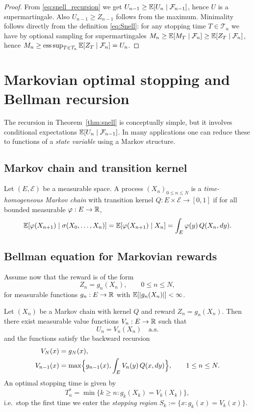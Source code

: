 \begin{proof}
From \eqref{eq:snell_recursion} we get $U_{n-1}\ge \mathbb{E}[U_n\mid\mathcal{F}_{n-1}]$, hence $U$ is a supermartingale.
Also $U_{n-1}\ge Z_{n-1}$ follows from the maximum. Minimality follows directly from the definition
\eqref{eq:Snell}: for any stopping time $T\in\mathcal{T}_n$ we have by optional sampling for supermartingales
$M_n\ge \mathbb{E}[M_T\mid\mathcal{F}_n]\ge \mathbb{E}[Z_T\mid\mathcal{F}_n]$, hence $M_n\ge \operatorname*{ess\,sup}_{T\in\mathcal{T}_n}\mathbb{E}[Z_T\mid\mathcal{F}_n]=U_n$.
\end{proof}

\section{Markovian optimal stopping and Bellman recursion}

The recursion in Theorem~\ref{thm:snell} is conceptually simple, but it involves conditional expectations
$\mathbb{E}[U_n\mid\mathcal{F}_{n-1}]$. In many applications one can reduce these to functions of a \emph{state variable}
using a Markov structure.

\subsection{Markov chain and transition kernel}

Let $(E,\mathcal{E})$ be a measurable space. A process $(X_n)_{0\le n\le N}$ is a \emph{time-homogeneous Markov chain}
with transition kernel $Q:E\times\mathcal{E}\to[0,1]$ if for all bounded measurable $\varphi:E\to\mathbb{R}$,
\[
\mathbb{E}[\varphi(X_{n+1})\mid \sigma(X_0,\dots,X_n)] = \mathbb{E}[\varphi(X_{n+1})\mid X_n]
= \int_E \varphi(y)\,Q(X_n,dy).
\]

\subsection{Bellman equation for Markovian rewards}

Assume now that the reward is of the form
\[
Z_n = g_n(X_n), \qquad 0\le n\le N,
\]
for measurable functions $g_n:E\to\mathbb{R}$ with $\mathbb{E}[|g_n(X_n)|]<\infty$.

\begin{theorem}\label{thm:bellman}
Let $(X_n)$ be a Markov chain with kernel $Q$ and reward $Z_n=g_n(X_n)$. Then there exist measurable
value functions $V_n:E\to\mathbb{R}$ such that
\[
U_n = V_n(X_n)\quad\text{a.s.}
\]
and the functions satisfy the backward recursion
\begin{align}
V_N(x) &= g_N(x), \label{eq:bellman_terminal}\\
V_{n-1}(x) &= \max\Bigl\{ g_{n-1}(x), \int_E V_n(y)\,Q(x,dy)\Bigr\}, \qquad 1\le n\le N. \label{eq:bellman}
\end{align}
An optimal stopping time is given by
\[
T_n^\ast = \min\{k\ge n: g_k(X_k)=V_k(X_k)\},
\]
i.e.\ stop the first time we enter the \emph{stopping region}
$S_k:=\{x: g_k(x)=V_k(x)\}$.
\end{theorem}

